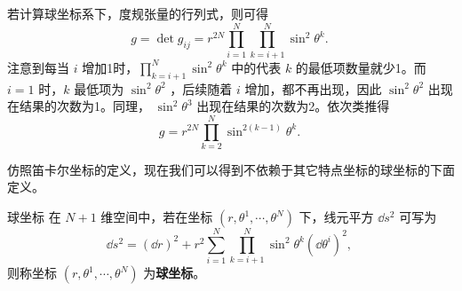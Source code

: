 若计算球坐标系下，度规张量的行列式，则可得
\begin{equation}
g=\det{g_{ij}}=r^{2N}\prod_{i=1}^N\prod\limits_{k=i+1}^{N}\sin^2\theta^{k}.~
\end{equation}
注意到每当 $i$ 增加1时，$\prod\limits_{k=i+1}^{N}\sin^2\theta^{k}$ 中的代表 $k$ 的最低项数量就少1。而 $i=1$ 时，$k$ 最低项为 $\sin ^2\theta^2$ ，后续随着 $i$ 增加，都不再出现，因此 $\sin ^2\theta^2$ 出现在结果的次数为1。同理， $\sin ^2\theta^3$ 出现在结果的次数为2。依次类推得
\begin{equation}
g=r^{2N}\prod\limits_{k=2}^{N}\sin^{2(k-1)}\theta^{k}.~
\end{equation}

仿照笛卡尔坐标的定义，现在我们可以得到不依赖于其它特点坐标的球坐标的下面定义。
\begin{definition}{球坐标}
在 $N+1$ 维空间中，若在坐标 $(r,\theta^1,\cdots,\theta^{N})$ 下，线元平方 $\dd s^2$ 可写为
\begin{equation}
\dd s^2=(\dd r)^2+ r^2\sum_{i=1}^N\prod\limits_{k=i+1}^{N}\sin^2\theta^{k}(\dd\theta^i)^2,~
\end{equation}
 则称坐标 $(r,\theta^1,\cdots,\theta^{N})$ 为\textbf{球坐标}。
\end{definition}


























